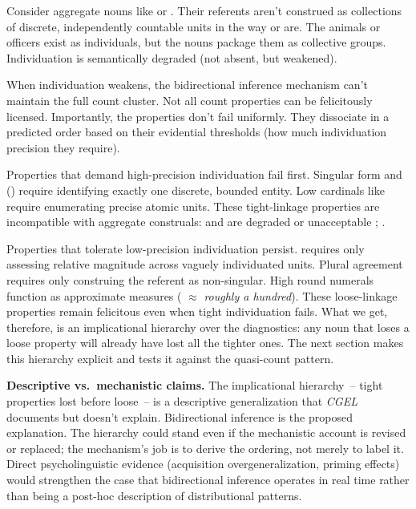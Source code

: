 \documentclass[12pt,a4paper]{article}
\begin{document}
Consider aggregate nouns like  or . Their referents aren't construed as collections of discrete, independently countable units in the way  or  are. The animals or officers exist as individuals, but the nouns package them as collective groups. Individuation is semantically degraded (not absent, but weakened).

When individuation weakens, the bidirectional inference mechanism can't maintain the full count cluster. Not all count properties can be felicitously licensed. Importantly, the properties don't fail uniformly. They dissociate in a predicted order based on their evidential thresholds (how much individuation precision they require).

Properties that demand high-precision individuation fail first. Singular form and () require identifying exactly one discrete, bounded entity. Low cardinals like  require enumerating precise atomic units. These tight-linkage properties are incompatible with aggregate construals:  and  are degraded or unacceptable \citep[p.~345]{huddleston2002}; \citep{corbett2019}.

Properties that tolerate low-precision individuation persist.  requires only assessing relative magnitude across vaguely individuated units. Plural agreement requires only construing the referent as non-singular. High round numerals function as approximate measures ( $\approx$ \textit{roughly a hundred}). These loose-linkage properties remain felicitous even when tight individuation fails.
What we get, therefore, is an implicational hierarchy over the diagnostics: any noun that loses a loose property will already have lost all the tighter ones. The next section makes this hierarchy explicit and tests it against the quasi-count pattern.

\textbf{Descriptive vs.\ mechanistic claims.} The implicational hierarchy~-- tight properties lost before loose~-- is a descriptive generalization that \textit{CGEL} documents but doesn't explain. Bidirectional inference is the proposed explanation. The hierarchy could stand even if the mechanistic account is revised or replaced; the mechanism's job is to derive the ordering, not merely to label it. Direct psycholinguistic evidence (acquisition overgeneralization, priming effects) would strengthen the case that bidirectional inference operates in real time rather than being a post-hoc description of distributional patterns.
\end{document}
